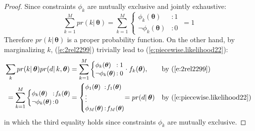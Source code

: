 \documentclass[letterpaper]{article}
\begin{document}
\begin{proof}
Since constraints $\phi_k$ are mutually exclusive and jointly exhaustive: 
{\footnotesize
$$\sum_{k= 1}^M pr(k | \, \boldsymbol\theta) = 
\sum_{k=1}^M
\begin{cases}
\phi_k(\boldsymbol\theta)   &: 1\\
\neg \phi_k(\boldsymbol\theta)  &: 0
\end{cases}
\, =1
$$
}
Therefore $pr(k | \, \boldsymbol\theta)$ is a proper probability function. 
On the other hand, by marginalizing $k$, (\ref{e:2rel2299})
trivially lead to (\ref{e:piecewise.likelihood22}):
%
{\small 
\begin{align*}
\sum_{k} pr(k | \, \boldsymbol\theta) pr(d | \, k, \boldsymbol\theta) 
&= 
\sum_{k=1}^M  
{\footnotesize
\begin{cases}
\phi_k(\boldsymbol\theta)         &\!\!\!\!\!: 1\\
\neg \phi_k(\boldsymbol\theta) &\!\!\!\!\!: 0
\end{cases}
}%
 \cdot f_k(\boldsymbol \theta)
,&&\text{by (\ref{e:2rel2299})}
\\
=
\sum_{k=1}^M
{\footnotesize
\begin{cases}
		\phi_k(\boldsymbol\theta)  &\!\!\!\!\!: \! f_k(\boldsymbol\theta)\\
\neg 	\phi_k(\boldsymbol\theta)  &\!\!\!\!\!:           \! 0
\end{cases}
}%
\!&= {\footnotesize
\begin{cases}
\phi_1(\boldsymbol\theta)  &\!\!\!\!\!:\! f_1(\boldsymbol\theta)\\
\vdots\\
\phi_M(\boldsymbol\theta)  &\!\!\!\!\!:\! f_M(\boldsymbol\theta)
\end{cases}
}%
\!\!= pr(d | \, \boldsymbol\theta) 
&&\text{by (\ref{e:piecewise.likelihood22})}
\end{align*}}
in which the third equality holds since constraints $\phi_k$ are mutually exclusive. 
\end{proof}
 
\end{document}
